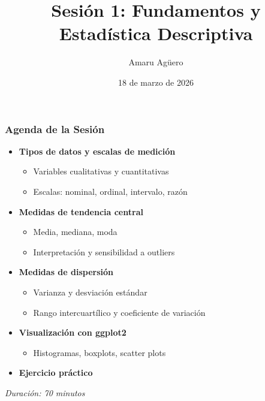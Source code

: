 \documentclass[aspectratio=169,11pt]{beamer}
\institute[CICS — UDD]{Doctorado en Ciencias de la Complejidad Social — CICS, UDD}
\date{18 de marzo de 2026}
\title{Sesión 1: Fundamentos y Estadística Descriptiva}
\author[A. Agüero]{Amaru Agüero}
\begin{document}
\frame{\titlepage}

\begin{frame}[fragile]
\frametitle{Agenda de la Sesión}

\begin{itemize}[<+->]
  \item \textbf{Tipos de datos y escalas de medición}
    \begin{itemize}
      \item Variables cualitativas y cuantitativas
      \item Escalas: nominal, ordinal, intervalo, razón
    \end{itemize}

  \item \textbf{Medidas de tendencia central}
    \begin{itemize}
      \item Media, mediana, moda
      \item Interpretación y sensibilidad a outliers
    \end{itemize}

  \item \textbf{Medidas de dispersión}
    \begin{itemize}
      \item Varianza y desviación estándar
      \item Rango intercuartílico y coeficiente de variación
    \end{itemize}

  \item \textbf{Visualización con ggplot2}
    \begin{itemize}
      \item Histogramas, boxplots, scatter plots
    \end{itemize}

  \item \textbf{Ejercicio práctico}
\end{itemize}

\vspace{0.5cm}
\centering \textit{Duración: 70 minutos}
\end{frame}
\end{document}
